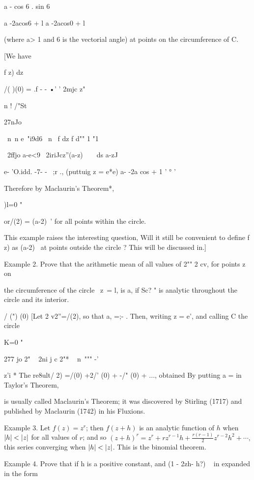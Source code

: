 {{a - cos 6 . sin 6

a -2acos6 + l a -2acos0 + l

(where a> 1 and 6 is the vectorial angle) at points on the
circumference of C.

[We have

f z) dz

/( )(0) = .f - - •' ' 2mjc z"

n ! /"St

27nJo

\ n\ n e~"i9d6 \ n \ f dz f d"" 1 "1

~2ffjo a-e<9 ~2iriJcz''(a-z)~~\ \ ds a-zJ

e- 'O.idd. -7- - ~;r ., (puttuig z = e*e) a- -2a cos + 1 ' ° '

Therefore by Maclaurin's Theorem*,

)l=0 "

or/(2) = (a-2)~' for all points within the circle.

This example raises the interesting question, Will it still be
convenient to define f z) as (a-2)~ at points outside the circle ?
This will be discussed in.]

Example 2. Prove that the arithmetic mean of all values of 2"" 2 cv,
for points z on

the circumference of the circle \ z\ = l, is a, if Sc? " is analytic
throughout the circle and its interior.

/ (") (0) [Let 2 v2''=/(2), so that a, =;- . Then, writing z = e',
and calling C the circle

K=0 "

277 jo 2" ~ 2ni j c 2"* ~ n\ """ -'

z'i * The re8ult/ 2) =/(0) +2/' (0) + -/" (0) + ..., obtained By
putting a = in Taylor's Theorem,

is usually called Maclaurin's Theorem; it was discovered by Stirling
(1717) and published by Maclaurin (1742) in his Fluxions.

%
%

Example 3. Let $f(z) = z^{r}$; then $f(z+h)$ is an analytic function
of $h$ when $\left| h \right| < \left| z \right|$ for all values of $r$; and so
$(z + h)^{r} = z^{r} + rz^{r-1} h + \frac{ r (r-1) }{2} z^{r-2} h^{2}
+ \cdots, $ this series converging when $\left| h \right| < \left| z \right|$.
This is the binomial theorem.

Example 4. Prove that if h is a positive constant, and (1 - 2zh- h?) ~
in expanded in the form

}}

